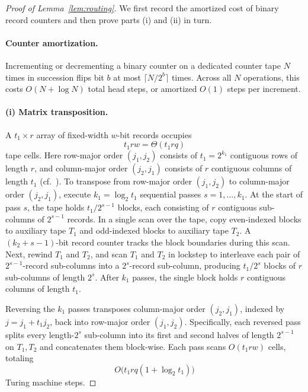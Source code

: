 \begin{proof}[Proof of Lemma~\ref{lem:routing}]
We first record the amortized cost of binary record counters and then prove parts (i) and (ii) in turn.

\paragraph{Counter amortization.}
Incrementing or decrementing a binary counter on a dedicated counter tape $N$ times in succession flips bit $b$ at most $\lceil N / 2^b \rceil$ times. Across all $N$ operations, this costs $O(N + \log N)$ total head steps, or amortized $O(1)$ steps per increment.

\paragraph{(i) Matrix transposition.}
A $t_1 \times r$ array of fixed-width $w$-bit records occupies
\[
  t_1 r w = \Theta(t_1 r q)
\]
tape cells. Here row-major order $(j_1, j_2)$ consists of $t_1 = 2^{k_1}$ contiguous rows of length $r$, and column-major order $(j_2, j_1)$ consists of $r$ contiguous columns of length $t_1$ (cf.\ \cite[Section~2.1]{HvdH21}). To transpose from row-major order $(j_1, j_2)$ to column-major order $(j_2, j_1)$, execute $k_1 = \log_2 t_1$ sequential passes $s = 1, \dots, k_1$. At the start of pass $s$, the tape holds $t_1 / 2^{s-1}$ blocks, each consisting of $r$ contiguous sub-columns of $2^{s-1}$ records. In a single scan over the tape, copy even-indexed blocks to auxiliary tape $T_1$ and odd-indexed blocks to auxiliary tape $T_2$. A $(k_2 + s - 1)$-bit record counter tracks the block boundaries during this scan. Next, rewind $T_1$ and $T_2$, and scan $T_1$ and $T_2$ in lockstep to interleave each pair of $2^{s-1}$-record sub-columns into a $2^s$-record sub-column, producing $t_1 / 2^s$ blocks of $r$ sub-columns of length $2^s$. After $k_1$ passes, the single block holds $r$ contiguous columns of length $t_1$.

Reversing the $k_1$ passes transposes column-major order $(j_2, j_1)$, indexed by $j = j_1 + t_1 j_2$, back into row-major order $(j_1, j_2)$. Specifically, each reversed pass splits every length-$2^s$ sub-column into its first and second halves of length $2^{s-1}$ on $T_1, T_2$ and concatenates them block-wise. Each pass scans $O(t_1 r w)$ cells, totaling
\[
  O\bigl(t_1 r q (1 + \log_2 t_1)\bigr)
\]
Turing machine steps.


\end{proof}

